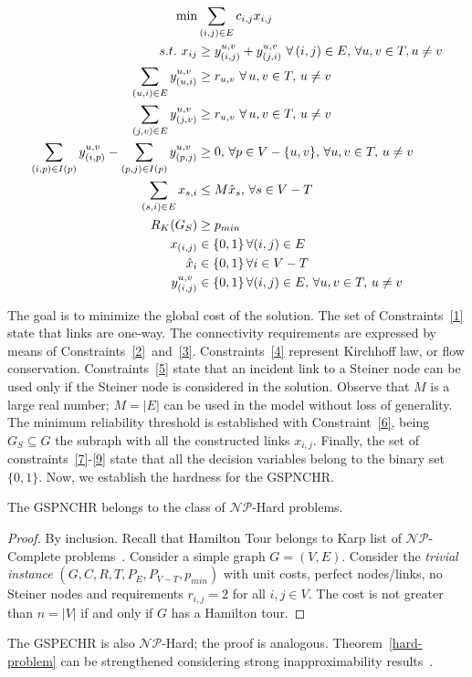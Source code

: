 \documentclass{llncs}
\begin{document}
\begin{align}
\min &\sum_{(i,j)\in E} c_{i,j}x_{i,j} \notag \\
s.t. \, \, x_{ij}&\geq y_{(i,j)}^{u,v}+y_{(j,i)}^{u,v} \, \, \forall \, (i,j)\in E, \, \forall u,v\in T, u\neq v \label{1}\\
\sum_{(u,i)\in E}y_{(u,i)}^{u,v} &\geq r_{u,v} \, \, \forall \, u,v\in T, \, u\neq v \label{2}\\
\sum_{(j,v)\in E}y_{(j,v)}^{u,v} &\geq r_{u,v} \, \, \forall \, u,v\in T, \, u\neq v \label{3}\\
\sum_{(i,p)\in I(p)}y_{(i,p)}^{u,v}  - \sum_{(p,j)\in I(p)}y_{(p,j)}^{u,v}&\geq 0, \, \forall p\in V-\{u,v\}, \, \forall u,v\in T, \, u\neq v \label{4}\\
\sum_{(s,i)\in E} x_{s,i} &\leq M \hat{x}_{s}, \, \forall s\in V-T \label{5}\\
R_{K}(G_S) &\geq p_{min} \label{6}\\
x_{(i,j)} &\in \{0,1\} \, \forall (i,j)\in E \label{7}\\
\hat{x}_{i} &\in \{0,1\} \, \forall i \in V-T  \label{8}\\
 y_{(i,j)}^{u,v} &\in \{0,1\} \, \forall (i,j)\in E, \, \forall u,v \in T, \, u\neq v \label{9}
\end{align}

The goal is to minimize the global cost of the solution. The set of Constraints~\ref{1} state that links are one-way. 
The connectivity requirements are expressed by means of Constraints~\ref{2}~and~\ref{3}. 
Constraints~\ref{4} represent Kirchhoff law, or flow conservation. Constraints~\ref{5} state that an incident link 
to a Steiner node can be used only if the Steiner node is considered in the solution. Observe that $M$ is a large real number; $M=|E|$ can be used in the model without loss of generality. The minimum reliability threshold is established with Constraint~\ref{6}, being 
$G_S \subseteq G$ the subraph with all the constructed links $x_{i,j}$. Finally, the set of constraints~\ref{7}-\ref{9} state that all the decision variables belong to the binary set $\{0,1\}$. Now, we establish the hardness for the GSPNCHR.
\begin{theorem}\label{hard-problem}
The GSPNCHR belongs to the class of $\mathcal{NP}$-Hard problems.
\end{theorem}
\begin{proof}
By inclusion. Recall that Hamilton Tour belongs to Karp list of $\mathcal{NP}$-Complete problems~\cite{9}. 
Consider a simple graph $G=(V,E)$. Consider the \emph{trivial instance} $(G,C,R,T,P_E,P_{V-T},p_{min})$ with 
unit costs, perfect nodes/links, no Steiner nodes and requirements $r_{i,j}=2$ for all $i,j \in V$. 
The cost is not greater than $n=|V|$ if and only if $G$ has a Hamilton tour. 
\end{proof}
The GSPECHR is also $\mathcal{NP}$-Hard; the proof is analogous. Theorem~\ref{hard-problem} can be strengthened considering strong inapproximability results~\cite{49}.\\
\end{document}
